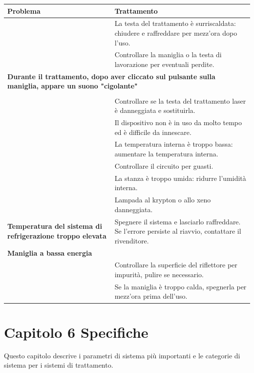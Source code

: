 \documentclass[10pt]{article}
\begin{document}
\begin{tabularx}{\textwidth}{|X|X|}
	\hline
	\textbf{Problema} & \textbf{Trattamento} \\
	\hline
	& La testa del trattamento è surriscaldata: chiudere e raffreddare per mezz'ora dopo l'uso. \\
	\hline
	& Controllare la maniglia o la testa di lavorazione per eventuali perdite. \\
	\hline
	\multicolumn{2}{|l|}{\textbf{Durante il trattamento, dopo aver cliccato sul pulsante sulla maniglia, appare un suono "cigolante"}} \\
	\multicolumn{2}{|c|}{} \\
	\hline
	& Controllare se la testa del trattamento laser è danneggiata e sostituirla. \\
	\hline
	& Il dispositivo non è in uso da molto tempo ed è difficile da innescare. \\
	\hline
	& La temperatura interna è troppo bassa: aumentare la temperatura interna. \\
	\hline
	& Controllare il circuito per guasti. \\
	\hline
	& La stanza è troppo umida: ridurre l'umidità interna. \\
	\hline
	& Lampada al krypton o allo xeno danneggiata. \\
	\hline
	\textbf{Temperatura del sistema di refrigerazione troppo elevata} & Spegnere il sistema e lasciarlo raffreddare. Se l'errore persiste al riavvio, contattare il rivenditore. \\
	\hline
	\multicolumn{2}{|l|}{\textbf{Maniglia a bassa energia}} \\
	\hline
	& Controllare la superficie del riflettore per impurità, pulire se necessario. \\
	\hline
	& Se la maniglia è troppo calda, spegnerla per mezz'ora prima dell'uso. \\
	\hline
\end{tabularx}

\section{Capitolo 6 Specifiche}
Questo capitolo descrive i parametri di sistema più importanti e le categorie di sistema per i sistemi di trattamento.
\end{document}
